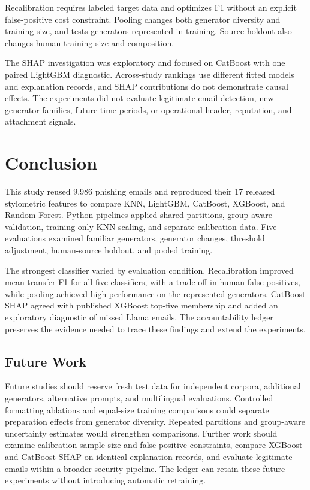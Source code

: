 \documentclass[conference]{IEEEtran}
\begin{document}
Recalibration requires labeled target data and optimizes F1
without an explicit false-positive cost constraint.
Pooling changes both generator diversity and training size,
and tests generators represented in training. Source holdout
also changes human training size and composition.

The SHAP investigation was exploratory and focused on CatBoost
with one paired LightGBM diagnostic. Across-study rankings
use different fitted models and explanation records, and
SHAP contributions do not demonstrate causal effects.
The experiments did not evaluate legitimate-email detection,
new generator families, future time periods, or operational
header, reputation, and attachment signals.

\section{Conclusion}
\label{sec:conclusion}

This study reused 9,986 phishing emails and reproduced their
17 released stylometric features to compare KNN, LightGBM,
CatBoost, XGBoost, and Random Forest. Python pipelines applied
shared partitions, group-aware validation, training-only KNN
scaling, and separate calibration data. Five evaluations
examined familiar generators, generator changes, threshold
adjustment, human-source holdout, and pooled training.

The strongest classifier varied by evaluation condition.
Recalibration improved mean transfer F1 for all five classifiers,
with a trade-off in human false positives, while pooling
achieved high performance on the represented generators.
CatBoost SHAP agreed with published XGBoost top-five membership
and added an exploratory diagnostic of missed Llama emails.
The accountability ledger preserves the evidence needed to
trace these findings and extend the experiments.

\subsection{Future Work}

Future studies should reserve fresh test data for independent
corpora, additional generators, alternative prompts, and
multilingual evaluations. Controlled formatting ablations
and equal-size training comparisons could separate preparation
effects from generator diversity. Repeated partitions and
group-aware uncertainty estimates would strengthen comparisons.
Further work should examine calibration sample size and
false-positive constraints, compare XGBoost and CatBoost SHAP
on identical explanation records, and evaluate legitimate emails
within a broader security pipeline. The ledger can retain
these future experiments without introducing automatic retraining.
\end{document}
